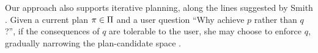 Our approach also supports iterative planning, along the lines
suggested by Smith \cite{smith:aaai-12}. Given a current plan
$\pi \in \Pi$ and a user question ``Why achieve $p$ rather than
$q$?'', if the consequences of $q$ are tolerable to the user, she may
choose to enforce $q$, gradually narrowing the plan-candidate space
\plans.
%
%


